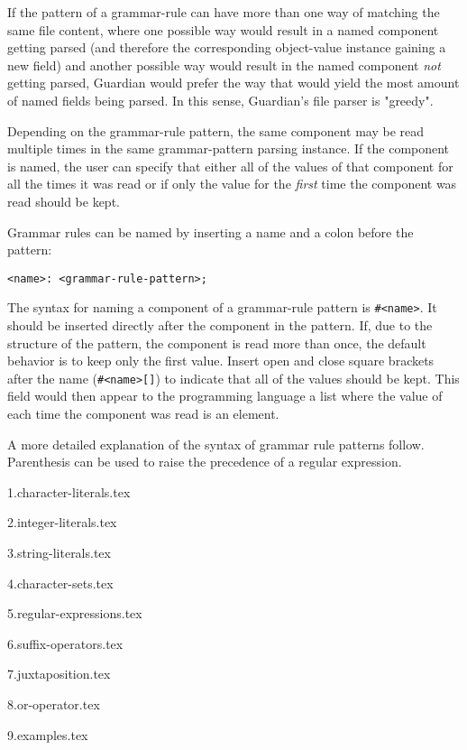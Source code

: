 {	If the pattern of a grammar-rule can have more than one way of matching
	the same file content, where one possible way would result in a named
	component getting parsed (and therefore the corresponding object-value
	instance gaining a new field) and another possible way would result in the
	named component \textit{not} getting parsed, Guardian would prefer the
	way that would yield the most amount of named fields being parsed.
	In this sense, Guardian's file parser is "greedy".
	
	Depending on the grammar-rule pattern, the same component may be read
	multiple times in the same grammar-pattern parsing instance. If the
	component is named, the user can specify that either all of the values
	of that component for all the times it was read or if
	only the value for the \textit{first} time the component was read
	should be kept.
	
	Grammar rules can be named by inserting a name and a colon before the pattern:
	\begin{lstlisting}[numbers = none, texcl = true, language = MAIA]
<name>: <grammar-rule-pattern>;
	\end{lstlisting}
	
	The syntax for naming a component of a grammar-rule pattern is
	\texttt{\#<name>}.
	It should be inserted directly after the component in the pattern.
	If, due to the structure of the pattern, the component is read more than
	once, the default behavior is to keep only the first value. Insert open
	and close square brackets after the name (\texttt{\#<name>[]}) to indicate
	that all of the values should be kept. This field would then appear to the
	programming language a list where the value of each time the component was
	read is an element.
	
	A more detailed explanation of the syntax of grammar rule patterns follow.
	Parenthesis can be used to raise the precedence of a regular expression.
	
	{1.character-literals.tex}
	
	{2.integer-literals.tex}
	
	{3.string-literals.tex}
	
	{4.character-sets.tex}
	
	{5.regular-expressions.tex}
	
	{6.suffix-operators.tex}
	
	{7.juxtaposition.tex}
	
	{8.or-operator.tex}
	
	{9.examples.tex}
}
















